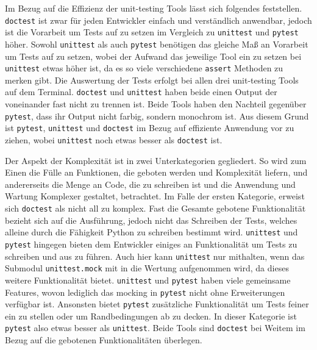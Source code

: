 Im Bezug auf die Effizienz der unit-testing Tools lässt sich folgendes
feststellen. \lstinline{doctest} ist zwar für jeden Entwickler einfach und
verständlich anwendbar, jedoch ist die Vorarbeit um Tests auf zu setzen im
Vergleich zu \lstinline{unittest} und \lstinline{pytest} höher. Sowohl
\lstinline{unittest} als auch \lstinline{pytest} benötigen das gleiche Maß an
Vorarbeit um Tests auf zu setzen, wobei der Aufwand das jeweilige Tool ein zu
setzen bei \lstinline{unittest} etwas höher ist, da es so viele verschiedene
\lstinline{assert} Methoden zu merken gibt. Die Auswertung der Tests erfolgt
bei allen drei unit-testing Tools auf dem Terminal. \lstinline{doctest} und
\lstinline{unittest} haben beide einen Output der voneinander fast nicht zu
trennen ist. Beide Tools haben den Nachteil gegenüber \lstinline{pytest}, dass
ihr Output nicht farbig, sondern monochrom ist.  Aus diesem Grund ist 
\lstinline{pytest}, \lstinline{unittest} und \lstinline{doctest} im Bezug auf
effiziente Anwendung vor zu ziehen, wobei \lstinline{unittest} noch etwas 
besser als \lstinline{doctest} ist.
\newline

Der Aspekt der Komplexität ist in zwei Unterkategorien gegliedert. So wird zum 
Einen die Fülle an Funktionen, die geboten werden und Komplexität liefern, und
andererseits die Menge an Code, die zu schreiben ist und die Anwendung und
Wartung Komplexer gestaltet, betrachtet. Im Falle der ersten Kategorie, erweist 
sich \lstinline{doctest} als nicht all zu komplex. Fast die Gesamte gebotene
Funktionalität bezieht sich auf die Ausführung, jedoch nicht das Schreiben der
Tests, welches alleine durch die Fähigkeit Python zu schreiben bestimmt wird.
\lstinline{unittest} und \lstinline{pytest} hingegen bieten dem Entwickler
einiges an Funktionalität um Tests zu schreiben und aus zu führen. Auch hier
kann \lstinline{unittest} nur mithalten, wenn das Submodul
\lstinline{unittest.mock} mit in die Wertung aufgenommen wird, da dieses
weitere Funktionalität bietet. \lstinline{unittest} und \lstinline{pytest}
haben viele gemeinsame Features, wovon lediglich das \gls{mock}ing in
\lstinline{pytest} nicht ohne Erweiterungen verfügbar ist. Ansonsten bietet
\lstinline{pytest} zusätzliche Funktionalität um Tests feiner ein zu
stellen oder um Randbedingungen ab zu decken. In dieser Kategorie ist
\lstinline{pytest} also etwas besser als \lstinline{unittest}. Beide Tools
sind \lstinline{doctest} bei Weitem im Bezug auf die gebotenen Funktionalitäten 
überlegen.


